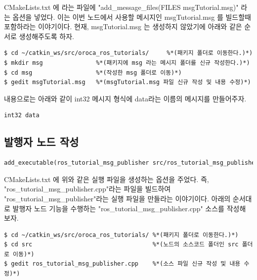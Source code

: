 CMakeLists.txt 에 라는 파일에 "add\_message\_files(FILES msgTutorial.msg)" 라는 옵션을 넣었다. 이는 이번 노드에서 사용할 메시지인 msgTutorial.msg 를 빌드할때 포함하라는 이야기이다. 현재, msgTutorial.msg 는 생성하지 않았기에 아래와 같은 순서로 생성해주도록 하자.

\begin{lstlisting}[language=ROS]
$ cd ~/catkin_ws/src/oroca_ros_tutorials/     %*(패키지 폴더로 이동한다.)*)
$ mkdir msg               %*(패키지에 msg 라는 메시지 폴더를 신규 작성한다.)*)
$ cd msg                  %*(작성한 msg 폴더로 이동)*)
$ gedit msgTutorial.msg   %*(msgTutorial.msg 파일 신규 작성 및 내용 수정)*)
\end{lstlisting}

\noindent
내용으로는 아래와 같이 int32 메시지 형식에 data라는 이름의 메시지를 만들어주자.

\begin{lstlisting}[language=ROS]
int32 data
\end{lstlisting}

\subsection{발행자 노드 작성}

\begin{lstlisting}[language=make]
add_executable(ros_tutorial_msg_publisher src/ros_tutorial_msg_publisher.cpp)
\end{lstlisting}

CMakeLists.txt 에 위와 같은 실행 파일을 생성하는 옵션을 주었다. 즉, "ros\_tutorial\_msg\_publisher.cpp"라는 파일을 빌드하여 "ros\_tutorial\_msg\_publisher"라는 실행 파일을 만들라는 이야기이다. 아래의 순서대로 발행자 노드 기능을 수행하는 "ros\_tutorial\_msg\_publisher.cpp" 소스를 작성해 보자. 

\begin{lstlisting}[language=ROS]
$ cd ~/catkin_ws/src/oroca_ros_tutorials/ %*(패키지 폴더로 이동한다.)*)
$ cd src                                  %*(노드의 소스코드 폴더인 src 폴더로 이동)*)
$ gedit ros_tutorial_msg_publisher.cpp    %*(소스 파일 신규 작성 및 내용 수정)*)
\end{lstlisting}

